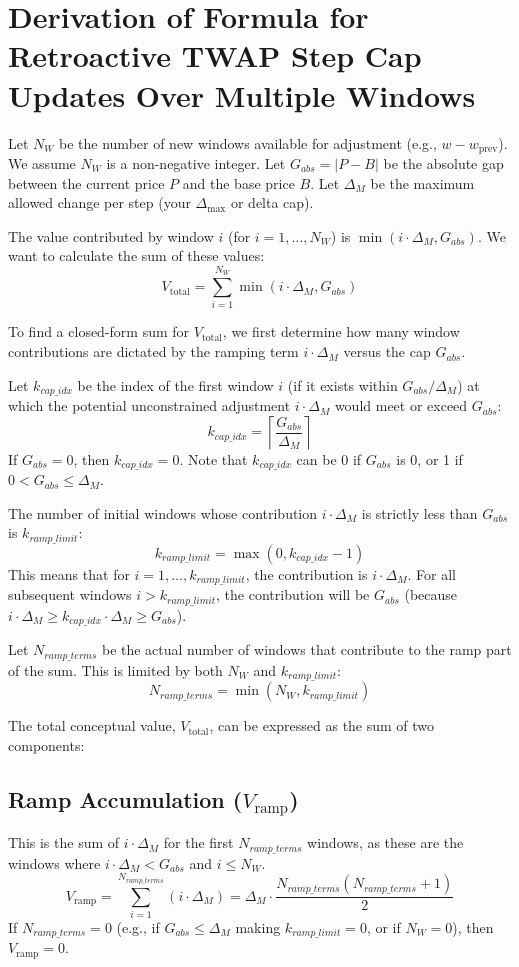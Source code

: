 \documentclass{article}
\begin{document}
\section*{Derivation of Formula for Retroactive TWAP Step Cap Updates Over Multiple Windows}

Let $N_W$ be the number of new windows available for adjustment (e.g., $w - w_{\text{prev}}$). We assume $N_W$ is a non-negative integer.
Let $G_{abs} = |P - B|$ be the absolute gap between the current price $P$ and the base price $B$.
Let $\Delta_M$ be the maximum allowed change per step (your $\Delta_{\max}$ or delta cap).

The value contributed by window $i$ (for $i=1, \dots, N_W$) is $\min(i \cdot \Delta_M, G_{abs})$.
We want to calculate the sum of these values:
\[ V_{\text{total}} = \sum_{i=1}^{N_W} \min(i \cdot \Delta_M, G_{abs}) \]

To find a closed-form sum for $V_{\text{total}}$, we first determine how many window contributions are dictated by the ramping term $i \cdot \Delta_M$ versus the cap $G_{abs}$.

Let $k_{cap\_idx}$ be the index of the first window $i$ (if it exists within $G_{abs}/\Delta_M$) at which the potential unconstrained adjustment $i \cdot \Delta_M$ would meet or exceed $G_{abs}$:
\[ k_{cap\_idx} = \left\lceil \frac{G_{abs}}{\Delta_M} \right\rceil \]
If $G_{abs} = 0$, then $k_{cap\_idx} = 0$. Note that $k_{cap\_idx}$ can be 0 if $G_{abs}$ is 0, or 1 if $0 < G_{abs} \le \Delta_M$.

The number of initial windows whose contribution $i \cdot \Delta_M$ is strictly less than $G_{abs}$ is $k_{ramp\_limit}$:
\[ k_{ramp\_limit} = \max(0, k_{cap\_idx} - 1) \]
This means that for $i=1, \dots, k_{ramp\_limit}$, the contribution is $i \cdot \Delta_M$. For all subsequent windows $i > k_{ramp\_limit}$, the contribution will be $G_{abs}$ (because $i \cdot \Delta_M \ge k_{cap\_idx} \cdot \Delta_M \ge G_{abs}$).

Let $N_{ramp\_terms}$ be the actual number of windows that contribute to the ramp part of the sum. This is limited by both $N_W$ and $k_{ramp\_limit}$:
\[ N_{ramp\_terms} = \min(N_W, k_{ramp\_limit}) \]

The total conceptual value, $V_{\text{total}}$, can be expressed as the sum of two components:

\subsection*{Ramp Accumulation ($V_{\text{ramp}}$)}
This is the sum of $i \cdot \Delta_M$ for the first $N_{ramp\_terms}$ windows, as these are the windows where $i \cdot \Delta_M < G_{abs}$ and $i \le N_W$.
\[ V_{\text{ramp}} = \sum_{i=1}^{N_{ramp\_terms}} (i \cdot \Delta_M) = \Delta_M \cdot \frac{N_{ramp\_terms}(N_{ramp\_terms}+1)}{2} \]
If $N_{ramp\_terms}=0$ (e.g., if $G_{abs} \le \Delta_M$ making $k_{ramp\_limit}=0$, or if $N_W=0$), then $V_{\text{ramp}} = 0$.
\end{document}
